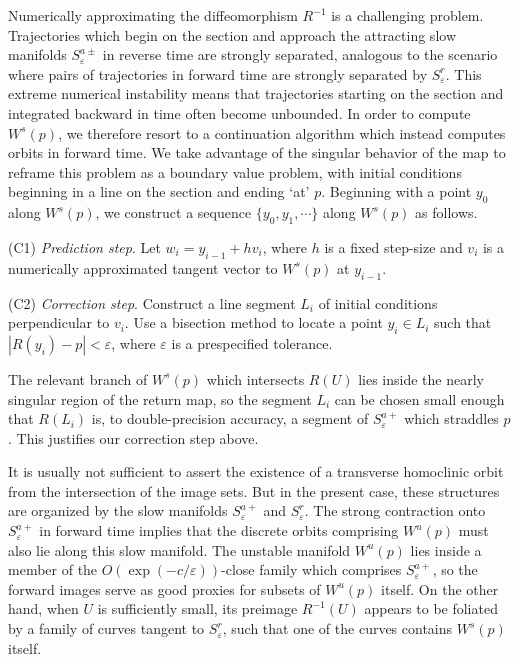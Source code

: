 \documentclass[aip, cha, sd, amsmath,amssymb, preprint]{revtex4-1}
\begin{document}
Numerically approximating the diffeomorphism $R^{-1}$ is a challenging problem. Trajectories which begin on the section and approach the attracting slow manifolds $S^{a\pm}_{ \varepsilon}$ in reverse time are strongly separated, analogous to the scenario where pairs of trajectories in forward time are strongly separated by $S^r_{ \varepsilon}$. This extreme numerical instability means that trajectories starting on the section and integrated backward in time often become unbounded. In order to compute $W^s(p)$, we therefore resort to a continuation algorithm which instead computes orbits in forward time. We take advantage of the singular behavior of the map to reframe this problem as a boundary value problem, with initial conditions beginning in a line on the section and ending `at' $p$. Beginning with a point $y_0$ along $W^s(p)$, we construct a sequence $\{y_0 , y_1, \cdots\}$ along $W^s(p)$ as follows.

(C1) {\it Prediction step}. Let $w_i = y_{i-1} + h v_i$, where $h$ is a fixed step-size and $v_i$ is a numerically approximated tangent vector to $W^s(p)$ at $y_{i-1}$.

(C2) {\it Correction step}. Construct a line segment $L_i$ of initial conditions perpendicular to $v_i$. Use a bisection method to locate a point $y_i \in L_i$ such that $|R(y_i) - p| < { \varepsilon}$, where ${ \varepsilon}$ is a prespecified tolerance.

The relevant branch of $W^s(p)$ which intersects $R(U)$ lies inside the nearly singular region of the return map, so the segment $L_i$ can be chosen small enough that $R(L_i)$ is, to double-precision accuracy, a segment of $S^{a+}_{ \varepsilon}$ which straddles $p$. This justifies our correction step above.

It is usually not sufficient to assert the existence of a transverse homoclinic orbit from the intersection of the image sets. But in the present case, these structures are organized by the slow manifolds $S^{a+}_{ \varepsilon}$ and $S^r_{ \varepsilon}$. The strong contraction onto $S^{a+}_{ \varepsilon}$ in forward time implies that the discrete orbits comprising $W^u(p)$ must also lie along this slow manifold. The unstable manifold $W^u(p)$ lies inside a member of the $O(\exp(-c/{ \varepsilon}))$-close family which comprises $S^{a+}_{ \varepsilon}$, so the forward images serve as good proxies for subsets of $W^u(p)$ itself. On the other hand, when $U$ is sufficiently small, its preimage $R^{-1}(U)$ appears to be foliated by a family of curves tangent to $S^r_{ \varepsilon}$, such that one of the curves contains $W^s(p)$ itself.
\end{document}
